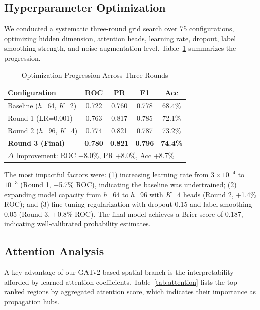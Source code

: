 \documentclass[conference]{IEEEtran}
\begin{document}
\subsection{Hyperparameter Optimization}
We conducted a systematic three-round grid search over 75 configurations, optimizing hidden dimension, attention heads, learning rate, dropout, label smoothing strength, and noise augmentation level. Table~\ref{tab:optimization} summarizes the progression.

\begin{table}[t]
\centering
\caption{Optimization Progression Across Three Rounds}
\label{tab:optimization}
\renewcommand{\arraystretch}{1.15}
\begin{tabular}{@{}lcccc@{}}
\toprule
\textbf{Configuration} & \textbf{ROC} & \textbf{PR} & \textbf{F1} & \textbf{Acc} \\
\midrule
Baseline ($h$=64, $K$=2) & 0.722 & 0.760 & 0.778 & 68.4\% \\
Round 1 (LR=0.001) & 0.763 & 0.817 & 0.785 & 72.1\% \\
Round 2 ($h$=96, $K$=4) & 0.774 & 0.821 & 0.787 & 73.2\% \\
\textbf{Round 3 (Final)} & \textbf{0.780} & \textbf{0.821} & \textbf{0.796} & \textbf{74.4\%} \\
\midrule
\multicolumn{5}{l}{\small $\Delta$ Improvement: ROC +8.0\%, PR +8.0\%, Acc +8.7\%} \\
\bottomrule
\end{tabular}
\end{table}

The most impactful factors were: (1) increasing learning rate from $3 \times 10^{-4}$ to $10^{-3}$ (Round 1, +5.7\% ROC), indicating the baseline was undertrained; (2) expanding model capacity from $h$=64 to $h$=96 with $K$=4 heads (Round 2, +1.4\% ROC); and (3) fine-tuning regularization with dropout 0.15 and label smoothing 0.05 (Round 3, +0.8\% ROC). The final model achieves a Brier score of 0.187, indicating well-calibrated probability estimates.

\subsection{Attention Analysis}
A key advantage of our GATv2-based spatial branch is the interpretability afforded by learned attention coefficients. Table~\ref{tab:attention} lists the top-ranked regions by aggregated attention score, which indicates their importance as propagation hubs.
\end{document}
